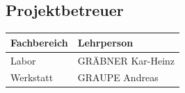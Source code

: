 \subsection{Projektbetreuer}
\begin{tabular}[h]{l|l}
		Fachbereich & Lehrperson\\
		\hline\hline
		Labor & GRÄBNER Kar-Heinz\\
		\hline
		Werkstatt & GRAUPE Andreas\\
	\end{tabular}
